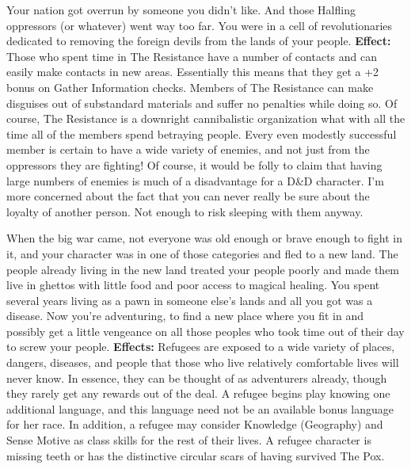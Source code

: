\medskip{}
{Your nation got overrun by someone you didn't like. And those Halfling oppressors (or whatever) went way too far. You were in a cell of revolutionaries dedicated to removing the foreign devils from the lands of your people.}
\textbf{Effect:}{ Those who spent time in The Resistance have a number of contacts and can easily make contacts in new areas. Essentially this means that they get a +2 bonus on Gather Information checks. Members of The Resistance can make disguises out of substandard materials and suffer no penalties while doing so. Of course, The Resistance is a downright cannibalistic organization what with all the time all of the members spend betraying people. Every even modestly successful member is certain to have a wide variety of enemies, and not just from the oppressors they are fighting! Of course, it would be folly to claim that having large numbers of enemies is much of a disadvantage for a D\&D character. I'm more concerned about the fact that you can never really be sure about the loyalty of another person. Not enough to risk sleeping with them anyway.}

\medskip{}
{When the big war came, not everyone was old enough or brave enough to fight in it, and your character was in one of those categories and fled to a new land. The people already living in the new land treated your people poorly and made them live in ghettos with little food and poor access to magical healing. You spent several years living as a pawn in someone else's lands and all you got was a disease. Now you're adventuring, to find a new place where you fit in and possibly get a little vengeance on all those peoples who took time out of their day to screw your people.}
\textbf{Effects:}{ Refugees are exposed to a wide variety of places, dangers, diseases, and people that those who live relatively comfortable lives will never know. In essence, they can be thought of as adventurers already, though they rarely get any rewards out of the deal. A refugee begins play knowing one additional language, and this language need not be an available bonus language for her race. In addition, a refugee may consider Knowledge (Geography) and Sense Motive as class skills for the rest of their lives. A refugee character is missing teeth or has the distinctive circular scars of having survived The Pox.}

